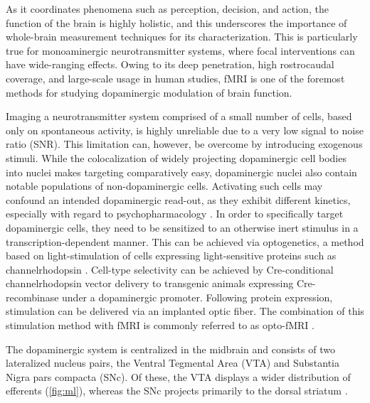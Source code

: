 As it coordinates phenomena such as perception, decision, and action, the function of the brain is highly holistic, and this underscores the importance of whole-brain measurement techniques for its characterization.
This is particularly true for monoaminergic neurotransmitter systems, where focal interventions can have wide-ranging effects.
Owing to its deep penetration, high rostrocaudal coverage, and large-scale usage in human studies, fMRI is one of the foremost methods for studying dopaminergic modulation of brain function.

Imaging a neurotransmitter system comprised of a small number of cells, based only on spontaneous activity, is highly unreliable due to a very low signal to noise ratio (SNR).
This limitation can, however, be overcome by introducing exogenous stimuli.
While the colocalization of widely projecting dopaminergic cell bodies into nuclei makes targeting comparatively easy, dopaminergic nuclei also contain notable populations of non-dopaminergic cells.
Activating such cells may confound an intended dopaminergic read-out, as they exhibit different kinetics, especially with regard to psychopharmacology \cite{Taylor2014}.
In order to specifically target dopaminergic cells, they need to be sensitized to an otherwise inert stimulus in a transcription-dependent manner.
This can be achieved via optogenetics, a method based on light-stimulation of cells expressing light-sensitive proteins such as channelrhodopsin \cite{Boyden2005}.
Cell-type selectivity can be achieved by Cre-conditional channelrhodopsin vector delivery \cite{Orban1992} to transgenic animals expressing Cre-recombinase under a dopaminergic promoter.
Following protein expression, stimulation can be delivered via an implanted optic fiber.
The combination of this stimulation method with fMRI is commonly referred to as opto-fMRI \cite{Desai2011,Grandjean2019}.

The dopaminergic system is centralized in the midbrain and consists of two lateralized nucleus pairs, the Ventral Tegmental Area (VTA) and Substantia Nigra pars compacta (SNc).
Of these, the VTA displays a wider distribution of efferents (\cref{fig:ml}), whereas the SNc projects primarily to the dorsal striatum \cite{Pan2010}.

